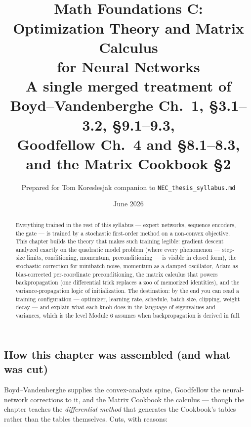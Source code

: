 \documentclass[11pt]{article}
\title{\vspace{-1.2em}{\large\sffamily Foundations for a Quant Research Pipeline}\\[0.4em]
\textbf{Math Foundations C:\\ Optimization Theory and Matrix Calculus\\ for Neural Networks}\\[0.3em]
{\large A single merged treatment of Boyd--Vandenberghe Ch.\ 1, \S3.1--3.2, \S9.1--9.3,\\ Goodfellow Ch.\ 4 and \S8.1--8.3, and the Matrix Cookbook \S2}}
\author{Prepared for Tom Koreslesjak \;\textperiodcentered\; companion to \texttt{NEC\_thesis\_syllabus.md}}
\date{June 2026}
\numberwithin{equation}{section}
\theoremstyle{plain}
\theoremstyle{definition}
\theoremstyle{remark}
\begin{document}
\maketitle
\vspace{-1.5em}

\begin{abstract}
\noindent Everything trained in the rest of this syllabus --- expert networks, sequence encoders, the gate --- is trained by a stochastic first-order method on a non-convex objective. This chapter builds the theory that makes such training legible: gradient descent analyzed exactly on the quadratic model problem (where every phenomenon --- step-size limits, conditioning, momentum, preconditioning --- is visible in closed form), the stochastic correction for minibatch noise, momentum as a damped oscillator, Adam as bias-corrected per-coordinate preconditioning, the matrix calculus that powers backpropagation (one differential trick replaces a zoo of memorized identities), and the variance-propagation logic of initialization. The destination: by the end you can read a training configuration --- optimizer, learning rate, schedule, batch size, clipping, weight decay --- and explain what each knob does in the language of eigenvalues and variances, which is the level Module 6 assumes when backpropagation is derived in full.
\end{abstract}

\tableofcontents

\subsection*{How this chapter was assembled (and what was cut)}

Boyd--Vandenberghe supplies the convex-analysis spine, Goodfellow the neural-network corrections to it, and the Matrix Cookbook the calculus --- though the chapter teaches the \emph{differential method} that generates the Cookbook's tables rather than the tables themselves. Cuts, with reasons:
\end{document}
